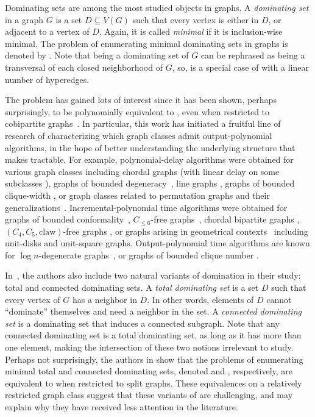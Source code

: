 Dominating sets are among the most studied objects in graphs.
A \emph{dominating set} in a graph $G$ is a set $D\subseteq V(G)$ such that every vertex is either in $D$, or adjacent to a vertex of $D$.
Again, it is called \emph{minimal} if it is inclusion-wise minimal.
The problem of enumerating minimal dominating sets in graphs is denoted by \domenum{}.
Note that being a dominating set of $G$ can be rephrased as being a transversal of each closed neighborhood of $G$, so, \domenum{} is a special case of \transenum{} with a linear number of hyperedges. 

The problem \domenum{} has gained lots of interest since it has been shown, perhaps surprisingly, to be polynomially equivalent to \transenum{}, even when restricted to cobipartite graphs~\cite{kante2014split}.
In particular, this work has initiated a fruitful line of research of characterizing which graph classes admit output-polynomial algorithms, in the hope of better understanding the underlying structure that makes \transenum{} tractable.
%
For example, polynomial-delay algorithms were obtained for various graph classes including chordal graphs \cite{kante2015chordal} (with linear delay on some subclasses \cite{kante2014split,defrain2019neighborhood}), graphs of bounded degeneracy~\cite{eiter2003new}, line graphs \cite{kante2015line}, graphs of bounded clique-width \cite{courcelle2009linear}, or graph classes related to permutation graphs and their generalizations~\cite{kante2012neighbourhood, golovach2018lmimwidth, bonamy2020comp}.
Incremental-polynomial time algorithms were obtained for graphs of bounded conformality~\cite{khachiyan2007conformality}, $C_{\leq 6}$-free graphs~\cite{golovach2015flipping}, chordal bi\-partite graphs \cite{golovach2016enumerating}, 
$(C_{4},C_{5},\text{claw})$-free graphs \cite{kante2012neighbourhood}, 
or graphs arising in geometrical contexts~\cite{elbassioni2019global,golovach2018lmimwidth} including unit-disks and unit-square graphs.
Output-polynomial time algorithms are known for $\log n$-degenerate graphs~\cite{eiter2003new}, or graphs of bounded clique number \cite{bonamy2020kt}.

In~\cite{kante2014split}, the authors also include two natural variants of domination in their study: total and connected dominating sets.
A \emph{total dominating set} is a set $D$ such that every vertex of $G$ has a neighbor in $D$.
In other words, elements of $D$ cannot ``dominate'' themselves and need a neighbor in the set.
A \emph{connected dominating set} is a dominating set that induces a connected subgraph.
Note that any connected dominating set is a total dominating set, as long as it has more than one element, making the intersection of these two notions irrelevant to study.
Perhaps not surprisingly, the authors in \cite{kante2014split} show that the problems of enumerating minimal total and connected dominating sets, denoted \tdomenum{} and \cdomenum{}, respectively, are equivalent to \transenum{} when restricted to split graphs.
These equivalences on a relatively restricted graph class suggest that 
these variants of \domenum{}
are challenging, and may explain why they have received less attention in the literature.

